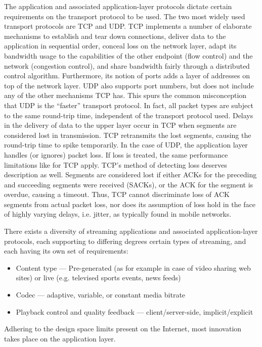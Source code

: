 The application and associated application-layer protocols dictate certain requirements on the transport protocol to be used. The two most widely used transport protocols are \gls{TCP} and \gls{UDP}.
\gls{TCP} implements a number of elaborate mechanisms to establish and tear down connections, deliver data to the application in sequential order, conceal loss on the network layer, adapt its bandwidth usage to the capabilities of the other endpoint (flow control) and the network (congestion control), and share bandwidth fairly through a distributed control algorithm. Furthermore, its notion of ports adds a layer of addresses on top of the network layer.
\gls{UDP} also supports port numbers, but does not include any of the other mechanisms \gls{TCP} has. This spurs the common misconception that \gls{UDP} is the ``faster'' transport protocol. In fact, all packet types are subject to the same round-trip time, independent of the transport protocol used. Delays in the delivery of data to the upper layer occur in \gls{TCP} when segments are considered lost in transmission. \gls{TCP} retransmits the lost segments, causing the round-trip time to spike temporarily. In the case of \gls{UDP}, the application layer handles (or ignores) packet loss. If loss is treated, the same performance limitations like for \gls{TCP} apply.
\gls{TCP}'s method of detecting loss deserves description as well. Segments are considered lost if either ACKs for the preceding and succeeding segments were received (SACKs), or the ACK for the segment is overdue, causing a timeout. Thus, \gls{TCP} cannot discriminate loss of ACK segments from actual packet loss, nor does its assumption of loss hold in the face of highly varying delays, i.e. jitter, as typically found in mobile networks.

There exists a diversity of streaming applications and associated application-layer protocols, each supporting to differing degrees certain types of streaming, and each having its own set of requirements:
\begin{itemize}
\item Content type --- Pre-generated (as for example in case of video sharing web sites) or live (e.g. televised sports events, news feeds)
\item Codec --- adaptive, variable, or constant media bitrate
\item Playback control and quality feedback --- client/server-side, implicit/explicit
\end{itemize}
Adhering to the design space limits present on the Internet, most innovation takes place on the application layer.

